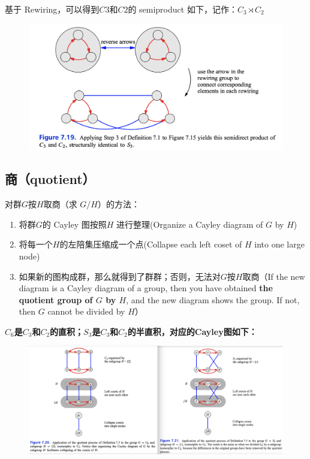 \documentclass[12pt]{article}
\begin{document}
基于 Rewiring，可以得到$C3$和$C2$的 semiproduct 如下，记作：$C_3 \rtimes C_2$
\begin{figure}[H]
    \centering
    \includegraphics[width=1\textwidth]{fig/Group/Cayley-C3-semiproduct-C2.png}
\end{figure}


\subsection{商（quotient）}
\begin{mdframed}[
linecolor=black!40,outerlinewidth=1pt,roundcorner=.5em,innertopmargin=1ex,innerbottommargin=.5\baselineskip,innerrightmargin=1em,innerleftmargin=1em,backgroundcolor=gray!5,
]
对群$G$按$H$取商（求 $G/H$）的方法：
\begin{enumerate}
\setlength{\itemsep}{0pt}
\setlength{\parsep}{0pt}
\setlength{\parskip}{0pt}
	\item 将群$G$的 Cayley 图按照$H$ 进行整理(Organize a Cayley diagram of $G$ by $H$)
	\item 将每一个$H$的左陪集压缩成一个点(Collapse each left coset of $H$ into one large node)
	\item 如果新的图构成群，那么就得到了群群；否则，无法对$G$按$H$取商（If the new diagram is a Cayley diagram of a group, then you have obtained \textbf{the quotient group of $G$ by $H$}, and the new diagram shows the group. If not, then $G$ cannot be divided by $H$）
\end{enumerate}
\end{mdframed}

\textbf{$C_6$是$C_3$和$C_2$的直积；$S_3$是$C_3$和$C_2$的半直积，对应的Cayley图如下：}
\begin{figure}[H]
    \centering
    \includegraphics[width=1\textwidth]{fig/Group/Cayley-C6S6-quotient-C3.png}
\end{figure}
\end{document}

